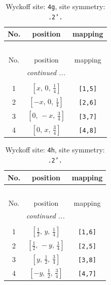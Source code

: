 \documentclass[fleqn,8pt]{jsarticle}
\begin{document}
\begin{longtable}{ccc}
\caption{Wyckoff site: {\tt 4g}, site symmetry: {\tt .2'.}}
 \\
 \hline \hline
No. & position & mapping \\ \hline \endfirsthead

\multicolumn{2}{l}{\tablename\ \thetable{}} \\
 \hline \hline
No. & position & mapping \\ \hline \endhead

 \hline \hline
\multicolumn{2}{r}{\footnotesize\it continued ...} \\ \endfoot

 \hline \hline
\multicolumn{2}{r}{} \\ \endlastfoot

1 & $\left[ x,\, 0,\, \frac{1}{4} \right]$ & {\tt [1,5]} \\ \hline
2 & $\left[ - x,\, 0,\, \frac{1}{4} \right]$ & {\tt [2,6]} \\ \hline
3 & $\left[ 0,\, - x,\, \frac{3}{4} \right]$ & {\tt [3,7]} \\ \hline
4 & $\left[ 0,\, x,\, \frac{3}{4} \right]$ & {\tt [4,8]} \\
\end{longtable}
\renewcommand{\arraystretch}{1.2}
\begin{longtable}{ccc}
\caption{Wyckoff site: {\tt 4h}, site symmetry: {\tt .2'.}}
 \\
 \hline \hline
No. & position & mapping \\ \hline \endfirsthead

\multicolumn{2}{l}{\tablename\ \thetable{}} \\
 \hline \hline
No. & position & mapping \\ \hline \endhead

 \hline \hline
\multicolumn{2}{r}{\footnotesize\it continued ...} \\ \endfoot

 \hline \hline
\multicolumn{2}{r}{} \\ \endlastfoot

1 & $\left[ \frac{1}{2},\, y,\, \frac{1}{4} \right]$ & {\tt [1,6]} \\ \hline
2 & $\left[ \frac{1}{2},\, - y,\, \frac{1}{4} \right]$ & {\tt [2,5]} \\ \hline
3 & $\left[ y,\, \frac{1}{2},\, \frac{3}{4} \right]$ & {\tt [3,8]} \\ \hline
4 & $\left[ - y,\, \frac{1}{2},\, \frac{3}{4} \right]$ & {\tt [4,7]} \\
\end{longtable}
\end{document}
